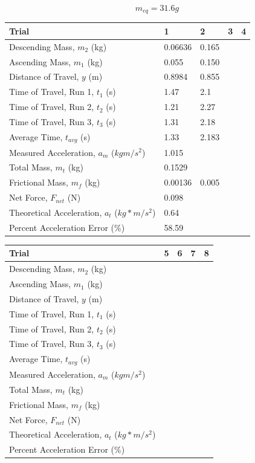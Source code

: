 \documentclass[11pt, titlepage]{article}
\begin{document}
\begin{center}
$$m_{eq} = 31.6 g$$
\begin{tabular}
{|m{7em}|m{7em}|m{7em}|m{7em}|m{7em}|}
\hline
Trial & 1 & 2 & 3 & 4 \\
\hline
Descending Mass, $m_2$ (kg) & 0.06636 & 0.165 & & \\
\hline
Ascending Mass, $m_1$ (kg) & 0.055 & 0.150 & & \\
\hline
Distance of Travel, $y$ (m) & 0.8984 & 0.855 & & \\
\hline
Time of Travel, Run 1, $t_1$ (s) & 1.47 & 2.1 & & \\
\hline
Time of Travel, Run 2, $t_2$ (s) & 1.21 & 2.27 & & \\
\hline
Time of Travel, Run 3, $t_3$ (s) & 1.31 & 2.18 & & \\
\hline
Average Time, $t_{avg}$ (s) & 1.33 & 2.183 & & \\
\hline
Measured Acceleration, $a_m$ ($kgm/s^2$) & 1.015 & & & \\
\hline
Total Mass, $m_t$ (kg) & 0.1529 & & & \\
\hline
Frictional Mass, $m_f$ (kg) & 0.00136 & 0.005 & & \\
\hline
Net Force, $F_{net}$ (N) & 0.098 & & & \\ 
\hline
Theoretical Acceleration, $a_t$ ($kg*m/s^2$) & 0.64 & & & \\
\hline
Percent Acceleration Error (\%) & 58.59 & & & \\
\hline
\end{tabular}
\begin{tabular}
{|m{7em}|m{7em}|m{7em}|m{7em}|m{7em}|}
\hline
Trial & 5 & 6 & 7 & 8 \\
\hline
Descending Mass, $m_2$ (kg) & & & & \\
\hline
Ascending Mass, $m_1$ (kg) & & & & \\
\hline
Distance of Travel, $y$ (m) & & & & \\
\hline
Time of Travel, Run 1, $t_1$ (s) & & & & \\
\hline
Time of Travel, Run 2, $t_2$ (s) & & & & \\
\hline
Time of Travel, Run 3, $t_3$ (s) & & & & \\
\hline
Average Time, $t_{avg}$ (s) & & & & \\
\hline
Measured Acceleration, $a_m$ ($kgm/s^2$) & & & & \\
\hline
Total Mass, $m_t$ (kg) & & & & \\
\hline
Frictional Mass, $m_f$ (kg) & & & & \\
\hline
Net Force, $F_{net}$ (N) & & & & \\ 
\hline
Theoretical Acceleration, $a_t$ ($kg*m/s^2$) & & & & \\
\hline
Percent Acceleration Error (\%) & & & & \\
\hline
\end{tabular}
\end{center}
\end{document}
